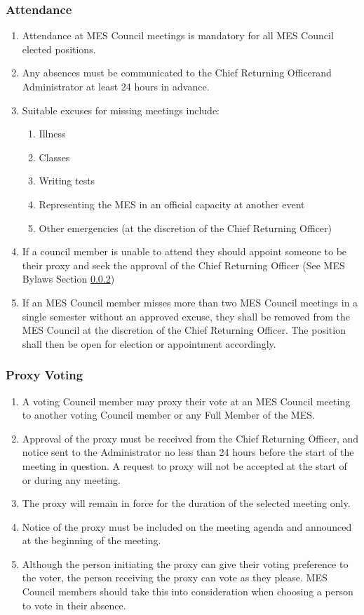\subsubsection{Attendance}
\label{attendance}
\begin{enumerate}
 \item
  Attendance at MES Council meetings is mandatory for all MES Council elected positions.
 \item
  Any absences must be communicated to the Chief Returning Officerand Administrator at least 24 hours in advance.
 \item
  Suitable excuses for missing meetings include:

  \begin{enumerate}
   \item
    Illness
   \item
    Classes
   \item
    Writing tests
   \item
    Representing the MES in an official capacity at another event
   \item
    Other emergencies (at the discretion of the Chief Returning Officer)
  \end{enumerate}
 \item
  If a council member is unable to attend they should appoint someone to be their proxy and seek the approval of the Chief Returning Officer (See MES Bylaws Section \ref{proxy-voting})
 \item
  If an MES Council member misses more than two MES Council meetings in a single semester without an approved excuse, they shall be removed from the MES Council at the discretion of the Chief Returning Officer. The position shall then be open for election or appointment accordingly.
\end{enumerate}

\subsubsection{Proxy Voting}
\label{proxy-voting}
\begin{enumerate}
 \item
  A voting Council member may proxy their vote at an MES Council meeting to another voting Council member or any Full Member of the MES.
 \item
  Approval of the proxy must be received from the Chief Returning Officer, and notice sent to the Administrator no less than 24 hours before the start of the meeting in question. A request to proxy will not be accepted at the start of or during any meeting.
 \item
  The proxy will remain in force for the duration of the selected meeting only.
 \item
  Notice of the proxy must be included on the meeting agenda and announced at the beginning of the meeting.
 \item
  Although the person initiating the proxy can give their voting preference to the voter, the person receiving the proxy can vote as they please. MES Council members should take this into consideration when choosing a person to vote in their absence.
\end{enumerate}

